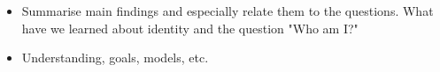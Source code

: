 \begin{itemize}
    \item Summarise main findings and especially relate them to the questions. What have we learned about identity and the question "Who am I?"
    \item Understanding, goals, models, etc. 
\end{itemize}




























